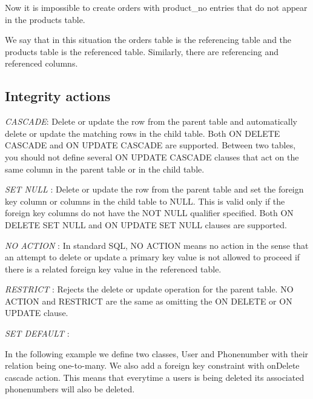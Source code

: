 \documentclass[11pt,a4paper]{report}
\begin{document}
Now it is impossible to create orders with product\_no entries that do not appear in the products table.

We say that in this situation the orders table is the referencing table and the products table is the referenced table. Similarly, there are referencing and referenced columns.

\subsection{Integrity actions}
\textsl{CASCADE}:\newline
Delete or update the row from the parent table and automatically delete or update the matching rows in the child table. Both ON DELETE CASCADE and ON UPDATE CASCADE are supported. Between two tables, you should not define several ON UPDATE CASCADE clauses that act on the same column in the parent table or in the child table.

\textsl{SET NULL} :\newline
Delete or update the row from the parent table and set the foreign key column or columns in the child table to NULL. This is valid only if the foreign key columns do not have the NOT NULL qualifier specified. Both ON DELETE SET NULL and ON UPDATE SET NULL clauses are supported.

\textsl{NO ACTION} :\newline
In standard SQL, NO ACTION means no action in the sense that an attempt to delete or update a primary key value is not allowed to proceed if there is a related foreign key value in the referenced table.

\textsl{RESTRICT} :\newline
Rejects the delete or update operation for the parent table. NO ACTION and RESTRICT are the same as omitting the ON DELETE or ON UPDATE clause.

\textsl{SET DEFAULT} :

In the following example we define two classes, User and Phonenumber with their relation being one-to-many. We also add a foreign key constraint with onDelete cascade action. This means that everytime a users is being deleted its associated phonenumbers will also be deleted.
\end{document}
